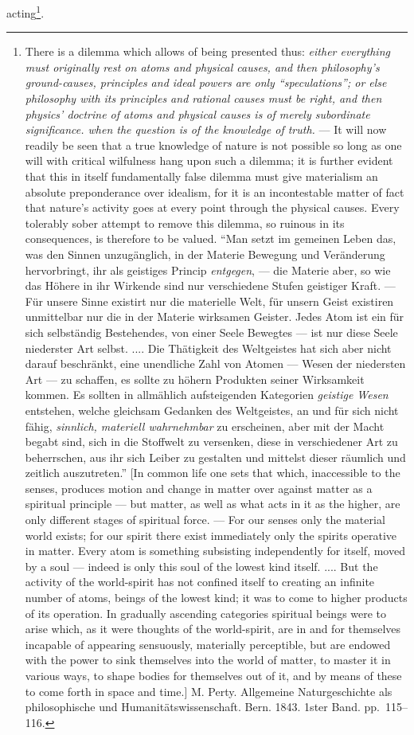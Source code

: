 \documentclass[12pt,a4paper]{book}
\begin{document}
acting\footnote{There is a dilemma which allows of being presented thus:
\emph{either everything must originally rest on atoms and physical causes, and
then philosophy's ground-causes, principles and ideal powers are only
``speculations''; or else philosophy with its principles and rational causes
must be right, and then physics' doctrine of atoms and physical causes is of
merely subordinate significance. when the question is of the knowledge of
truth.} --- It will now readily be seen that a true knowledge of nature is not
possible so long as one will with critical wilfulness hang upon such a dilemma;
it is further evident that this in itself fundamentally false dilemma must give
materialism an absolute preponderance over idealism, for it is an incontestable
matter of fact that nature's activity goes at every point through the physical
causes. Every tolerably sober attempt to remove this dilemma, so ruinous in its
consequences, is therefore to be valued. ``Man setzt im gemeinen Leben das, was
den Sinnen unzugänglich, in der Materie Bewegung und Veränderung hervorbringt,
ihr als geistiges Princip \emph{entgegen}, --- die Materie aber, so wie
das Höhere in ihr Wirkende sind nur verschiedene Stufen geistiger Kraft.
--- Für unsere Sinne existirt nur die materielle Welt, für unsern
Geist existiren unmittelbar nur die in der Materie wirksamen Geister.
Jedes Atom ist ein für sich selbständig Bestehendes, von einer Seele
Bewegtes --- ist nur diese Seele niederster Art selbst. .... Die
Thätigkeit des Weltgeistes hat sich aber nicht darauf beschränkt, eine
unendliche Zahl von Atomen --- Wesen der niedersten Art --- zu
schaffen, es sollte zu höhern Produkten seiner Wirksamkeit kommen. Es
sollten in allmählich aufsteigenden Kategorien \emph{geistige Wesen}
entstehen, welche gleichsam Gedanken des Weltgeistes, an und für sich
nicht fähig, \emph{sinnlich, materiell wahrnehmbar} zu erscheinen, aber
mit der Macht begabt sind, sich in die Stoffwelt zu versenken, diese in
verschiedener Art zu beherrschen, aus ihr sich Leiber zu gestalten und
mittelst dieser räumlich und zeitlich auszutreten.'' [In common life one sets
that which, inaccessible to the senses, produces motion and change in matter
over against matter as a spiritual principle --- but matter, as well as what
acts in it as the higher, are only different stages of spiritual force. --- For
our senses only the material world exists; for our spirit there exist
immediately only the spirits operative in matter. Every atom is something
subsisting independently for itself, moved by a soul --- indeed is only this
soul of the lowest kind itself. .... But the activity of the world-spirit has
not confined itself to creating an infinite number of atoms, beings of the
lowest kind; it was to come to higher products of its operation. In gradually
ascending categories spiritual beings were to arise which, as it were thoughts
of the world-spirit, are in and for themselves incapable of appearing
sensuously, materially perceptible, but are endowed with the power to sink
themselves into the world of matter, to master it in various ways, to shape
bodies for themselves out of it, and by means of these to come forth in space
and time.] M. Perty. Allgemeine Naturgeschichte als philosophische und
Humanitätswissenschaft. Bern. 1843. 1ster Band. pp.~115--116.}.
\end{document}
